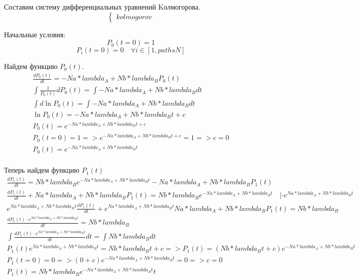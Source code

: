 \newpage

Составим систему дифференциальных уравнений Kолмогорова.
\[
\begin{cases}
    {{ kolmogorov }}
\end{cases}
\]

Начальные условия:
$$P_0(t=0)=1$$
$$P_i(t=0)=0 \quad \forall i \in [1, {{ pathsN }}]$$

Найдем функцию $P_0(t)$.
\begin{gather*}
    \frac{dP_0(t)}{dt} = -{{ Na * lambda_A + Nb * lambda_B }} P_0 (t)\\
    \int \frac{1}{P_0 (t)} d P_0(t) = \int -{{ Na * lambda_A + Nb * lambda_B }} dt\\
    \int d \ln P_0 (t) = \int -{{ Na * lambda_A + Nb * lambda_B }} dt\\
    \ln P_0 (t) = -{{ Na * lambda_A + Nb * lambda_B }} t + c\\
    P_0 (t) = e^{-{{ Na * lambda_A + Nb * lambda_B }} t + c}\\
    P_0(t = 0) = 1 => e^{-{{ Na * lambda_A + Nb * lambda_B }} t + c} = 1 => c = 0\\
    P_0 (t) = e^{-{{ Na * lambda_A + Nb * lambda_B }} t}\\
\end{gather*}

Теперь найдем функцию $P_1 (t)$
\begin{gather*}
    \frac{d P_1(t)}{dt} = {{ Nb * lambda_B }} e^{-{{ Na * lambda_A + Nb * lambda_B }} t} - {{ Na * lambda_A + Nb * lambda_B }} P_1(t)\\
    \frac{d P_1(t)}{dt} + {{ Na * lambda_A + Nb * lambda_B }} P_1(t) = {{ Nb * lambda_B }} e^{ -{{ Na * lambda_A + Nb * lambda_B }} t} \quad |\cdot e^{ {{ Na * lambda_A + Nb * lambda_B }} t} \\
    e^{ {{ Na * lambda_A + Nb * lambda_B }} t} \frac{d P_1(t)}{dt} + e^{ {{ Na * lambda_A + Nb * lambda_B }} t} {{ Na * lambda_A + Nb * lambda_B }} P_1(t) = {{ Nb * lambda_B }}\\
    \frac{d P_1(t) \cdot e^{ {{ Na * lambda_A + Nb * lambda_B }} t }}{dt} = {{ Nb * lambda_B }}\\
    \int \frac{d P_1(t) \cdot e^{ {{ Na * lambda_A + Nb * lambda_B }} t } }{dt} dt = \int {{ Nb * lambda_B }} dt\\
    P_1(t) e^{ {{ Na * lambda_A + Nb * lambda_B }} t } = {{ Nb * lambda_B }} t + c => P_1(t) = ( {{ Nb * lambda_B }} t + c) e^{ -{{ Na * lambda_A + Nb * lambda_B }} t } \\
    P_1(t=0) = 0 => ( 0 + c ) e^{ -{{ Na * lambda_A + Nb * lambda_B }} t } = 0 => c=0\\
    P_1(t) = {{ Nb * lambda_B }} e^{ -{{ Na * lambda_A + Nb * lambda_B }} t } t\\
\end{gather*}

